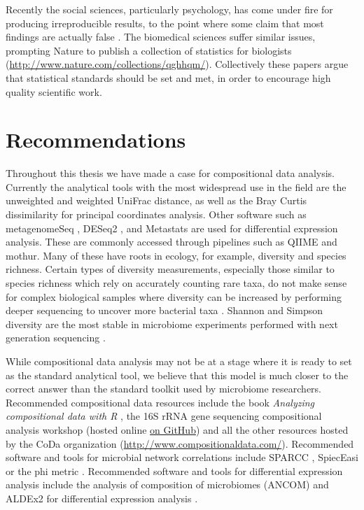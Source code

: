 Recently the social sciences, particularly psychology, has come under fire for producing irreproducible results, to the point where some claim that most findings are actually false \cite{ioannidis2005most}. The biomedical sciences suffer similar issues, prompting Nature to publish a collection of statistics for biologists (\url{http://www.nature.com/collections/qghhqm/}). Collectively these papers argue that statistical standards should be set and met, in order to encourage high quality scientific work.

\section{Recommendations}
Throughout this thesis we have made a case for compositional data analysis. Currently the analytical tools with the most widespread use in the field are the unweighted and weighted UniFrac distance, as well as the Bray Curtis dissimilarity for principal coordinates analysis. Other software such as metagenomeSeq \cite{paulson2014metagenomeseq}, DESeq2 \cite{love2014moderated}, and Metastats \cite{paulson2011metastats} are used for differential expression analysis. These are commonly accessed through pipelines such as QIIME and mothur. Many of these have roots in ecology, for example, diversity and species richness. Certain types of diversity measurements, especially those similar to species richness which rely on accurately counting rare taxa, do not make sense for complex biological samples where diversity can be increased by performing deeper sequencing to uncover more bacterial taxa \cite{haegeman2013robust}. Shannon and Simpson diversity are the most stable in microbiome experiments performed with next generation sequencing \cite{haegeman2013robust}.

While compositional data analysis may not be at a stage where it is ready to set as the standard analytical tool, we believe that this model is much closer to the correct answer than the standard toolkit used by microbiome researchers. Recommended compositional data resources include the book \textit{Analyzing compositional data with R} \cite{van2013analyzing}, the 16S rRNA gene sequencing compositional analysis workshop (hosted online \href{https://github.com/ggloor/compositions/blob/master/background_reading/CJM_supplement/workshop.pdf}{on GitHub}) and all the other resources hosted by the CoDa organization (\url{http://www.compositionaldata.com/}). Recommended software and tools for microbial network correlations include SPARCC \cite{friedman2012inferring}, SpiecEasi \cite{kurtz2015sparse} or the phi metric \cite{lovell2015proportionality}. Recommended software and tools for differential expression analysis include the analysis of composition of microbiomes (ANCOM) \cite{mandal2015analysis} and ALDEx2 for differential expression analysis \cite{fernandes2014unifying}.

